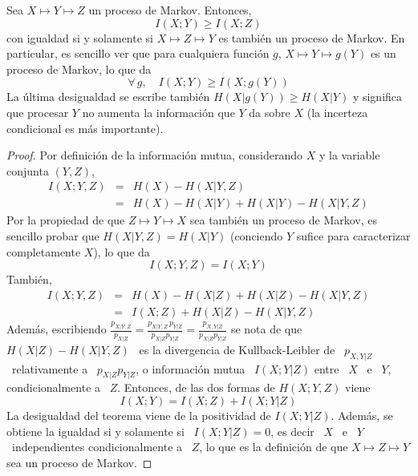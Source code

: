 \begin{teorema}
  Sea  $X \mapsto  Y \mapsto  Z$ un  proceso de  Markov. Entonces,
  \[
  I(X;Y) \ge I(X;Z)
  \]
  con igualdad si y solamente si $X \mapsto Z \mapsto Y$ es tambi\'en un proceso
  de Markov. En  particular, es sencillo ver que  para cualquiera funci\'on $g$,
  $X \mapsto Y \mapsto g(Y)$ es un proceso de Markov, lo que da
  \[
  \forall \, g, \quad I(X;Y) \ge I(X;g(Y))
  \]
  La  \'ultima  desigualdad  se  escribe  tambi\'en  $H(X|g(Y))  \ge  H(X|Y)$  y
  significa que  procesar $Y$ no aumenta  la informaci\'on que $Y$  da sobre $X$
  (la incerteza condicional es m\'as importante).
\end{teorema}
%
\begin{proof}
  Por definici\'on  de la  informaci\'on mutua, considerando  $X$ y  la variable
  conjunta $(Y,Z)$,
  \begin{eqnarray*}
  I(X ; Y,Z) & = & H(X) - H(X|Y,Z)\\[2.5mm]
  & = & H(X) - H(X|Y) + H(X|Y) - H(X|Y,Z)
  \end{eqnarray*}
  \noindent Por  la propiedad de  que $Z \mapsto  Y \mapsto X$ sea  tambi\'en un
  proceso de Markov,  es sencillo probar que $H(X|Y,Z)  = H(X|Y)$ (conciendo $Y$
  sufice para caracterizar completamente $X$), lo que da
  \[
  I(X;Y,Z) = I(X;Y)
  \]
  Tambi\'en,
  \begin{eqnarray*}
  I(X ; Y,Z) & = & H(X) - H(X|Z) + H(X|Z) - H(X|Y,Z)\\[2.5mm]
  & = & I(X;Z) + H(X|Z) - H(X|Y,Z)
  \end{eqnarray*}
  \noindent  Adem\'as, escribiendo $\frac{p_{X|Y,Z}}{p_{X|Z}}  = \frac{p_{X|Y,Z}
    \, p_{Y|Z}}{p_{X|Z} p_{Y|Z}} = \frac{p_{X,Y|Z}}{p_{X|Z} p_{Y|Z}}$ se nota de
  que  \ $H(X|Z)  -  H(X|Y,Z)$ \  es  la divergencia  de  Kullback-Leibler de  \
  $p_{X,Y|Z}$ \  relativamente a  \ $p_{X|Z} p_{Y|Z}$,  o informaci\'on  mutua \
  $I(X;Y|Z)$ entre \ $X$ \ e \  $Y$, condicionalmente a \ $Z$.  Entonces, de las
  dos formas de $H(X;Y,Z)$ viene
  \[
  I(X;Y) = I(X;Z) + I(X;Y|Z)
  \]
  La desigualdad del teorema viene de la positividad de $I(X;Y|Z)$. Adem\'as, se
  obtiene la igualdad si  y solamente si \ $I(X;Y|Z) = 0$, es decir  \ $X$ \ e \
  $Y$ \  independientes condicionalmente a \  $Z$, lo que es  la definici\'on de
  que $X \mapsto Z \mapsto Y$ sea un proceso de Markov.
\end{proof}


